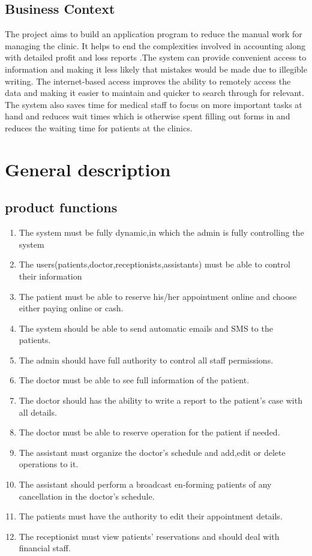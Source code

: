 \documentclass[]{article}
\begin{document}
\subsection{Business Context}

The project aims to build an application program to reduce the manual work for managing the clinic. It helps to end the complexities involved in accounting along with detailed profit and loss reports .The system can provide convenient access to information and making it less likely that mistakes would be made due to illegible writing. The internet-based access improves the ability to remotely access the data and making it easier to maintain and quicker to search through for relevant. The system also saves time for medical staff to focus on more important tasks at hand and reduces wait times which is otherwise spent filling out forms in and reduces the waiting time for patients at the clinics.


\section{General description}
\subsection{product functions}

\begin{enumerate}
  \item The system must be fully dynamic,in which the admin is fully controlling the system
  \item The users(patients,doctor,receptionists,assistants) must be able to control their information 
  \item The patient must be able to reserve his/her appointment online and choose either paying online or cash.
  \item The system should be able to send automatic emails and SMS to the patients.
  \item The admin should have full authority to control all staff permissions.
  \item The doctor must be able to see full information of the patient.
  \item The doctor should has the ability to write a report to the patient's case with all details.
  \item The doctor must be able to reserve operation for the patient if needed.
  \item The assistant must organize the doctor's schedule and add,edit or delete operations to it.
  \item The assistant should perform a broadcast en-forming patients of any cancellation in the doctor's schedule.
  \item The patients must have the authority to edit their appointment details.
  \item The receptionist must view patients' reservations and should deal with financial staff.
\end{enumerate}
\end{document}
